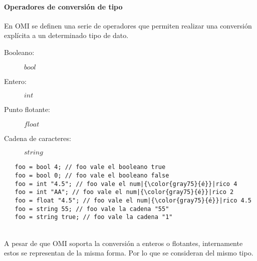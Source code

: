 
\paragraph{Operadores de conversión de tipo} \label{sec:op_type}
En OMI se definen una serie de operadores que permiten realizar una conversión explícita a un determinado tipo de dato.

\begin{description}
\item [Booleano:] $bool$
\item [Entero:] $int$
\item [Punto flotante:] $float$
\item [Cadena de caracteres:] $string$
\end{description} 

\begin{lstlisting}
   foo = bool 4; // foo vale el booleano true
   foo = bool 0; // foo vale el booleano false
   foo = int "4.5"; // foo vale el num|{\color{gray75}{é}}|rico 4
   foo = int "AA"; // foo vale el num|{\color{gray75}{é}}|rico 2
   foo = float "4.5"; // foo vale el num|{\color{gray75}{é}}|rico 4.5
   foo = string 55; // foo vale la cadena "55" 
   foo = string true; // foo vale la cadena "1" 
\end{lstlisting} 
\hfill\\

A pesar de que OMI soporta la conversión a enteros o flotantes, internamente estos se representan de la misma forma. Por lo que
se consideran del mismo tipo.


